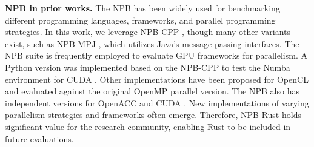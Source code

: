 \textbf{NPB in prior works.} The NPB has been widely used for benchmarking different programming languages, frameworks, and parallel programming strategies. In this work, we leverage NPB-CPP \cite{NPB-CPP-2021}, though many other variants exist, such as NPB-MPJ \cite{NPB-MPJ}, which utilizes Java's message-passing interfaces. The NPB suite is frequently employed to evaluate GPU frameworks for parallelism. A Python version was implemented based on the NPB-CPP to test the Numba environment for CUDA \cite{NPB-PY}. Other implementations have been proposed for OpenCL \cite{npb-opencl} and evaluated against the original OpenMP parallel version. The NPB also has independent versions for OpenACC \cite{npb-openacc} and CUDA \cite{NPB-CUDA}. New implementations of varying parallelism strategies and frameworks often emerge. Therefore, NPB-Rust holds significant value for the research community, enabling Rust to be included in future evaluations.










